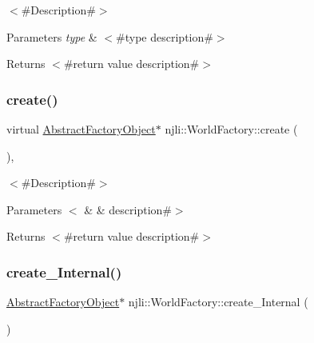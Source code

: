 $<$\#\+Description\#$>$


\begin{DoxyParams}{Parameters}
{\em type} & $<$\#type description\#$>$\\
\hline
\end{DoxyParams}
\begin{DoxyReturn}{Returns}
$<$\#return value description\#$>$ 
\end{DoxyReturn}
\mbox{\label{classnjli_1_1_world_factory_ab146b0b572a8f4806637ebf25b2df26a}} 
\subsubsection{\texorpdfstring{create()}{create()}\hspace{0.1cm}{\footnotesize\ttfamily [2/2]}}
{\footnotesize\ttfamily virtual \mbox{\hyperlink{classnjli_1_1_abstract_factory_object}{Abstract\+Factory\+Object}}$\ast$ njli\+::\+World\+Factory\+::create (\begin{DoxyParamCaption}\item[{const \mbox{\hyperlink{classnjli_1_1_abstract_builder}{Abstract\+Builder}} \&}]{ }\end{DoxyParamCaption})\hspace{0.3cm}{\ttfamily [protected]}, {\ttfamily [virtual]}}

$<$\#\+Description\#$>$


\begin{DoxyParams}[1]{Parameters}
$<$ & {\em } & description\#$>$\\
\hline
\end{DoxyParams}
\begin{DoxyReturn}{Returns}
$<$\#return value description\#$>$ 
\end{DoxyReturn}
\mbox{\label{classnjli_1_1_world_factory_a125d628843dd041a05fad61340caaad6}} 
\subsubsection{\texorpdfstring{create\+\_\+\+Internal()}{create\_Internal()}\hspace{0.1cm}{\footnotesize\ttfamily [1/2]}}
{\footnotesize\ttfamily \mbox{\hyperlink{classnjli_1_1_abstract_factory_object}{Abstract\+Factory\+Object}}$\ast$ njli\+::\+World\+Factory\+::create\+\_\+\+Internal (\begin{DoxyParamCaption}\item[{const \mbox{\hyperlink{_util_8h_a10e94b422ef0c20dcdec20d31a1f5049}{u32}}}]{ }\end{DoxyParamCaption})\hspace{0.3cm}{\ttfamily [protected]}}

